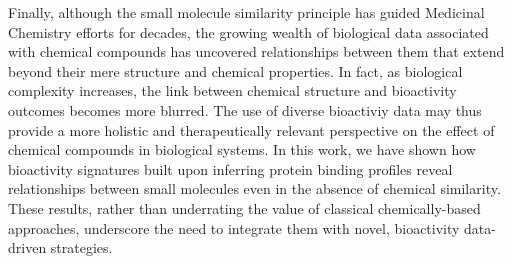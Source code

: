 Finally, although the small molecule similarity principle has guided Medicinal Chemistry efforts for decades, the growing wealth of biological data associated with chemical compounds has uncovered relationships between them that extend beyond their mere structure and chemical properties. In fact, as biological complexity increases, the link between chemical structure and bioactivity outcomes becomes more blurred. The use of diverse bioactiviy data may thus provide a more holistic and therapeutically relevant perspective on the effect of chemical compounds in biological systems. In this work, we have shown how bioactivity signatures built upon inferring protein binding profiles reveal relationships between small molecules even in the absence of chemical similarity. These results, rather than underrating the value of classical chemically-based approaches, underscore the need to integrate them with novel, bioactivity data-driven strategies. 





